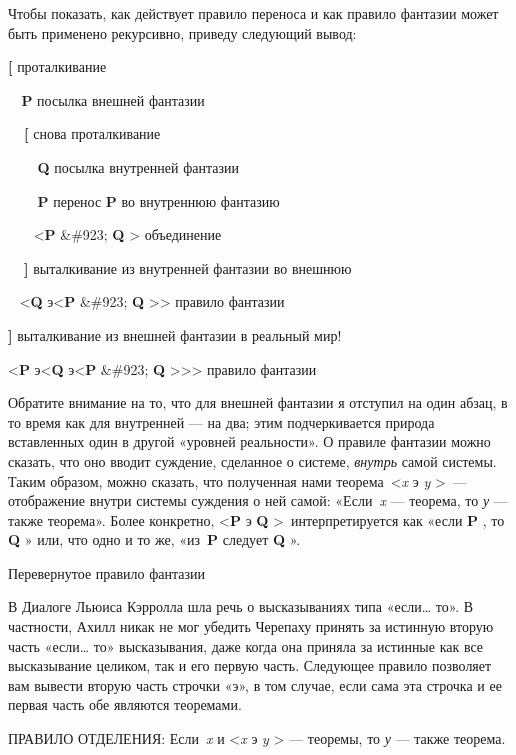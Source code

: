 Чтобы показать, как действует правило переноса и как правило фантазии может быть применено рекурсивно, приведу следующий вывод:

\textbf{{[}} проталкивание

\textbf{~ P} посылка внешней фантазии

\textbf{~~{[}} снова проталкивание

\textbf{~~~ Q} посылка внутренней фантазии

\textbf{~~~ P} перенос \textbf{P} во внутреннюю фантазию

~~~ \textless{}\textbf{P} \&\#923; \textbf{Q} \textgreater{} объединение

\textbf{~~{]}} выталкивание из внутренней фантазии во внешнюю

~ \textless{}\textbf{Q} э\textless{}\textbf{P} \&\#923; \textbf{Q} \textgreater\textgreater{} правило фантазии

\textbf{{]}} выталкивание из внешней фантазии в реальный мир!

\textless{}\textbf{P} э\textless{}\textbf{Q} э\textless{}\textbf{P} \&\#923; \textbf{Q} \textgreater\textgreater\textgreater{} правило фантазии

Обратите внимание на то, что для внешней фантазии я отступил на один абзац, в то время как для внутренней --- на два; этим подчеркивается природа вставленных один в другой «уровней реальности». О правиле фантазии можно сказать, что оно вводит суждение, сделанное о системе, \emph{внутрь} самой системы. Таким образом, можно сказать, что полученная нами теорема~\textless{}\emph{x} э \emph{y} \textgreater~--- отображение внутри системы суждения о ней самой: «Если~\emph{x} --- теорема, то \emph{у} --- также теорема». Более конкретно, \textless{}\textbf{P} э \textbf{Q} \textgreater~интерпретируется как «если \textbf{P} , то \textbf{Q} » или, что одно и то же, «из~\textbf{P} следует \textbf{Q} ».

Перевернутое правило фантазии

В Диалоге Льюиса Кэрролла шла речь о высказываниях типа «если\ldots{} то». В частности, Ахилл никак не мог убедить Черепаху принять за истинную вторую часть «если\ldots{} то» высказывания, даже когда она приняла за истинные как все высказывание целиком, так и его первую часть. Следующее правило позволяет вам вывести вторую часть строчки «э», в том случае, если сама эта строчка и ее первая часть обе являются теоремами.

ПРАВИЛО ОТДЕЛЕНИЯ: Если~\emph{x} и \textless{}\emph{x} э \emph{y} \textgreater{} --- теоремы, то \emph{у} --- также теорема.

